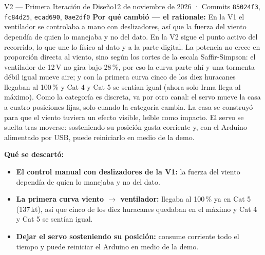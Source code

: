 \documentclass[11pt,a4paper]{article}
\begin{document}
\begin{versionbox}{V2 — Primera Iteración de Diseño}{12 de noviembre de 2026 · Commits \texttt{85024f3}, \texttt{fc84d25}, \texttt{ecad690}, \texttt{0ae2df0}}
		\vspace{0.15cm}
		\noindent\textbf{Por qué cambió — el rationale:}
		En la V1 el ventilador se controlaba a mano con deslizadores, así que la fuerza del viento dependía de quien lo manejaba y no del dato. En la V2 sigue el punto activo del recorrido, lo que une lo físico al dato y a la parte digital.
		La potencia no crece en proporción directa al viento, sino según los cortes de la escala Saffir-Simpson: el ventilador de 12\,V no gira bajo 28\,\%, por eso la curva parte ahí y una tormenta débil igual mueve aire; y con la primera curva cinco de los diez huracanes llegaban al 100\,\% y Cat 4 y Cat 5 se sentían igual (ahora solo Irma llega al máximo).
		Como la categoría es discreta, va por otro canal: el servo mueve la casa a cuatro posiciones fijas, solo cuando la categoría cambia. La casa se construyó para que el viento tuviera un efecto visible, leíble como impacto.
		El servo se suelta tras moverse: sosteniendo su posición gasta corriente y, con el Arduino alimentado por USB, puede reiniciarlo en medio de la demo.

		\vspace{0.15cm}
		\noindent\textbf{Qué se descartó:}
		\begin{itemize}
			\item \textbf{El control manual con deslizadores de la V1:} la fuerza del viento dependía de quien lo manejaba y no del dato.
			\item \textbf{La primera curva viento $\rightarrow$ ventilador:} llegaba al 100\,\% ya en Cat 5 (137\,kt), así que cinco de los diez huracanes quedaban en el máximo y Cat 4 y Cat 5 se sentían igual.
			\item \textbf{Dejar el servo sosteniendo su posición:} consume corriente todo el tiempo y puede reiniciar el Arduino en medio de la demo.
		\end{itemize}
	\end{versionbox}

	\vspace{0.4cm}
\end{document}
